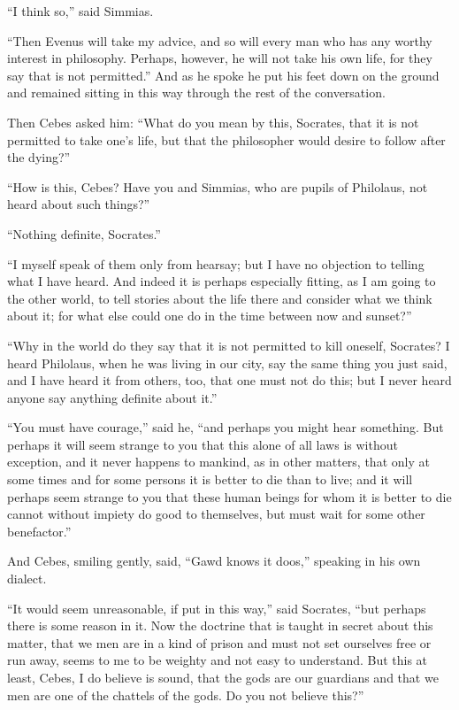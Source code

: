 \documentclass[letterpaper,12pt]{article}
\newcommand{\stephpag}[1]{\marginnote{\small\itshape\fontfamily{ppl}\selectfont #1}}
\begin{document}
\begin{drama}
``I think so,'' said Simmias.
 
``Then Evenus will take my advice, and so will every man who has any worthy interest in philosophy. Perhaps, however, he will not take his own life, for they say that is not permitted.'' \stephpag{d} And as he spoke he put his feet down on the ground and remained sitting in this way through the rest of the conversation.
 
Then Cebes asked him: ``What do you mean by this, Socrates, that it is not permitted to take one's life, but that the philosopher would desire to follow after the dying?''
 
``How is this, Cebes? Have you and Simmias, who are pupils of Philolaus, not heard about such things?''
 
``Nothing definite, Socrates.''
 
``I myself speak of them only from hearsay; but I have no objection to telling what I have heard. And indeed it is perhaps especially fitting, \stephpag{e} as I am going to the other world, to tell stories about the life there and consider what we think about it; for what else could one do in the time between now and sunset?''
 
``Why in the world do they say that it is not permitted to kill oneself, Socrates? I heard Philolaus, when he was living in our city, say the same thing you just said, and I have heard it from others, too, that one must not do this; but I never heard anyone say \stephpag{62 a} anything definite about it.''
 
``You must have courage,'' said he, ``and perhaps you might hear something. But perhaps it will seem strange to you that this alone of all laws is without exception, and it never happens to mankind, as in other matters, that only at some times and for some persons it is better to die than to live; and it will perhaps seem strange to you that these human beings for whom it is better to die cannot without impiety do good to themselves, but must wait for some other benefactor.''
 
And Cebes, smiling gently, said, ``Gawd knows it doos,'' speaking in his own dialect.
 
``It would seem unreasonable, if put in this way,'' said Socrates, \stephpag{b} ``but perhaps there is some reason in it. Now the doctrine that is taught in secret about this matter, that we men are in a kind of prison and must not set ourselves free or run away, seems to me to be weighty and not easy to understand. But this at least, Cebes, I do believe is sound, that the gods are our guardians and that we men are one of the chattels of the gods. Do you not believe this?''
 

\end{drama}
\end{document}
